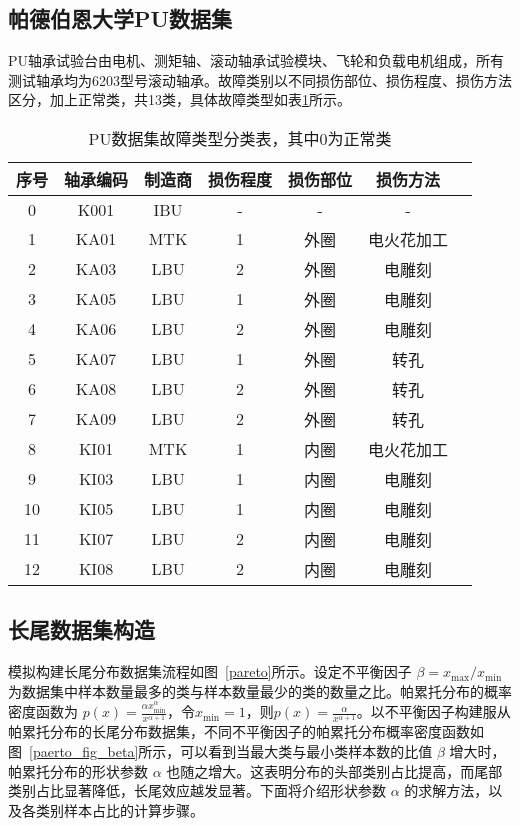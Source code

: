 \documentclass[master]{thesis-uestc}
\begin{document}
\subsection{帕德伯恩大学PU数据集}
PU轴承试验台由电机、测矩轴、滚动轴承试验模块、飞轮和负载电机组成，所有测试轴承均为6203型号滚动轴承。故障类别以不同损伤部位、损伤程度、损伤方法区分，加上正常类，共13类，具体故障类型如表\ref{tab:pu_fault_types}所示。
\begin{table}[H]
    \centering
    \caption{PU数据集故障类型分类表，其中0为正常类}
    \renewcommand\arraystretch{1.2}
    \begin{tabular}{ccccccc}
        \toprule
        序号 & 轴承编码 & 制造商 & 损伤程度 & 损伤部位 & 损伤方法 \\
        \midrule
        0  & K001 & IBU & - & - & - \\
        1  & KA01 & MTK & 1 & 外圈 & 电火花加工 \\
        2  & KA03 & LBU & 2 & 外圈 & 电雕刻 \\
        3  & KA05 & LBU & 1 & 外圈 & 电雕刻 \\
        4  & KA06 & LBU & 2 & 外圈 & 电雕刻 \\
        5  & KA07 & LBU & 1 & 外圈 & 转孔 \\
        6  & KA08 & LBU & 2 & 外圈 & 转孔 \\
        7  & KA09 & LBU & 2 & 外圈 & 转孔 \\
        8  & KI01 & MTK & 1 & 内圈 & 电火花加工 \\
        9  & KI03 & LBU & 1 & 内圈 & 电雕刻 \\
        10 & KI05 & LBU & 1 & 内圈 & 电雕刻 \\
        11 & KI07 & LBU & 2 & 内圈 & 电雕刻 \\
        12 & KI08 & LBU & 2 & 内圈 & 电雕刻 \\
        \bottomrule
    \end{tabular}
    \label{tab:pu_fault_types}
\end{table}

\subsection{长尾数据集构造}
模拟构建长尾分布数据集流程如图~\ref{pareto}所示。设定不平衡因子 \(\beta = x_{\text{max}} / x_{\text{min}}\) 为数据集中样本数量最多的类与样本数量最少的类的数量之比。帕累托分布的概率密度函数为 \(p(x) = \frac{\alpha x_{\text{min}}^{\alpha}}{x^{\alpha+1}}\)，令$x_{\text{min}} = 1$，则\(p(x) = \frac{\alpha}{x^{\alpha+1}}\)。以不平衡因子构建服从帕累托分布的长尾分布数据集，不同不平衡因子的帕累托分布概率密度函数如图~\ref{paerto_fig_beta}所示，可以看到当最大类与最小类样本数的比值 \(\beta\) 增大时，帕累托分布的形状参数 \(\alpha\) 也随之增大。这表明分布的头部类别占比提高，而尾部类别占比显著降低，长尾效应越发显著。下面将介绍形状参数 \(\alpha\) 的求解方法，以及各类别样本占比的计算步骤。
\end{document}
